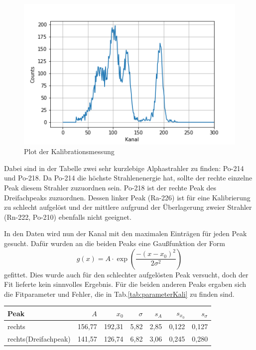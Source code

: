 \begin{figure}[h]
    \centering
    \includegraphics[scale=0.75]{Bilder/kali.png}
    \caption{Plot der Kalibrationsmessung} 
    \label{bild:kali}
\end{figure}


Dabei sind in der Tabelle zwei sehr kurzlebige Alphastrahler zu finden: Po-214 und Po-218. Da Po-214 die höchste Strahlenenergie hat, 
sollte der rechte einzelne Peak diesem Strahler zuzuordnen sein. Po-218 ist der rechte Peak des Dreifachpeaks zuzuordnen. Dessen 
linker Peak (Ra-226) ist für eine Kalibrierung zu schlecht aufgelöst und der mittlere aufgrund der Überlagerung zweier Strahler 
(Rn-222, Po-210) ebenfalls nicht geeignet. \footnotemark
{}

In den Daten wird nun der Kanal mit den maximalen Einträgen für jeden Peak gesucht. Dafür wurden an die beiden Peaks eine Gaußfunktion der Form 
\begin{equation*}
    g(x) = A \cdot \exp(\frac{-(x - x_0)^2}{2\sigma^2})
\end{equation*}
gefittet. Dies wurde auch für den schlechter aufgelösten Peak versucht, doch der Fit lieferte kein sinnvolles Ergebnis. Für die beiden anderen Peaks ergaben sich die 
Fitparameter und Fehler, die in Tab.\ref{tab:parameterKali} zu finden sind.

\begin{center}
    \centering
    \begin{tabular}{l|rrrrrr}
        Peak & $A$ &  $x_0$ & $\sigma$ & $s_A$ & $s_{x_0}$ & $s_{\sigma}$\\
        \hline
        rechts & 156,77 & 192,31 & 5,82 & 2,85 & 0,122 & 0,127\\
        rechts(Dreifachpeak) & 141,57 & 126,74 & 6,82 & 3,06 & 0,245 & 0,280\\
    \end{tabular}
    \label{tab:parameterKali}
\end{center}

